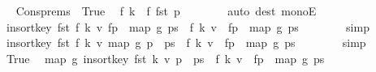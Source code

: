 \begin{isabellebody}
\ \isamarkupfalse%
\ Cons{\isachardot}{\kern0pt}prems{\isacharparenleft}{\kern0pt}{}{\isacharparenright}{\kern0pt}\ \ True\ \isamarkupfalse%
\ {\isachardoublequoteopen}f\ k\ {\isasymle}\ f\ {\isacharparenleft}{\kern0pt}fst\ p{\isacharparenright}{\kern0pt}{\isachardoublequoteclose}\isanewline
\ \ \ \ \ \ \isamarkupfalse%
\ {\isacharparenleft}{\kern0pt}auto\ dest{\isacharcolon}{\kern0pt}\ monoE{\isacharparenright}{\kern0pt}\isanewline
\ \ \ \ \isamarkupfalse%
\ \isamarkupfalse%
\ {\isachardoublequoteopen}insort{\isacharunderscore}{\kern0pt}key\ fst\ {\isacharparenleft}{\kern0pt}f\ k{\isacharcomma}{\kern0pt}\ v{\isacharparenright}{\kern0pt}\ {\isacharparenleft}{\kern0pt}{\isacharquery}{\kern0pt}f{\isacharunderscore}{\kern0pt}p\ {\isacharhash}{\kern0pt}\ map\ {\isacharquery}{\kern0pt}g\ ps{\isacharparenright}{\kern0pt}\ {\isacharequal}{\kern0pt}\ {\isacharparenleft}{\kern0pt}f\ k{\isacharcomma}{\kern0pt}\ v{\isacharparenright}{\kern0pt}\ {\isacharhash}{\kern0pt}\ {\isacharquery}{\kern0pt}f{\isacharunderscore}{\kern0pt}p\ {\isacharhash}{\kern0pt}\ map\ {\isacharquery}{\kern0pt}g\ ps{\isachardoublequoteclose}\isanewline
\ \ \ \ \ \ \isamarkupfalse%
\ simp\isanewline
\ \ \ \ \isamarkupfalse%
\ \isamarkupfalse%
\ {\isachardoublequoteopen}insort{\isacharunderscore}{\kern0pt}key\ fst\ {\isacharparenleft}{\kern0pt}f\ k{\isacharcomma}{\kern0pt}\ v{\isacharparenright}{\kern0pt}\ {\isacharparenleft}{\kern0pt}map\ {\isacharquery}{\kern0pt}g\ {\isacharparenleft}{\kern0pt}p\ {\isacharhash}{\kern0pt}\ ps{\isacharparenright}{\kern0pt}{\isacharparenright}{\kern0pt}\ {\isacharequal}{\kern0pt}\ {\isacharparenleft}{\kern0pt}f\ k{\isacharcomma}{\kern0pt}\ v{\isacharparenright}{\kern0pt}\ {\isacharhash}{\kern0pt}\ {\isacharquery}{\kern0pt}f{\isacharunderscore}{\kern0pt}p\ {\isacharhash}{\kern0pt}\ map\ {\isacharquery}{\kern0pt}g\ ps{\isachardoublequoteclose}\isanewline
\ \ \ \ \ \ \isamarkupfalse%
\ simp\isanewline
\ \ \ \ \isamarkupfalse%
\ \isamarkupfalse%
\ True\ \isamarkupfalse%
\ {\isachardoublequoteopen}map\ {\isacharquery}{\kern0pt}g\ {\isacharparenleft}{\kern0pt}insort{\isacharunderscore}{\kern0pt}key\ fst\ {\isacharparenleft}{\kern0pt}k{\isacharcomma}{\kern0pt}\ v{\isacharparenright}{\kern0pt}\ {\isacharparenleft}{\kern0pt}p\ {\isacharhash}{\kern0pt}\ ps{\isacharparenright}{\kern0pt}{\isacharparenright}{\kern0pt}\ {\isacharequal}{\kern0pt}\ {\isacharparenleft}{\kern0pt}f\ k{\isacharcomma}{\kern0pt}\ v{\isacharparenright}{\kern0pt}\ {\isacharhash}{\kern0pt}\ {\isacharquery}{\kern0pt}f{\isacharunderscore}{\kern0pt}p\ {\isacharhash}{\kern0pt}\ map\ {\isacharquery}{\kern0pt}g\ ps{\isachardoublequoteclose}\isanewline

\end{isabellebody}
